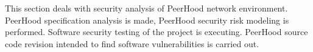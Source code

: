 %
%
This section deals with security analysis of PeerHood network environment. 
%
PeerHood specification analysis is made, PeerHood security risk modeling is performed. 
%
Software security testing of the project is executing. 
%
PeerHood source code revision intended to find software vulnerabilities is carried out. 